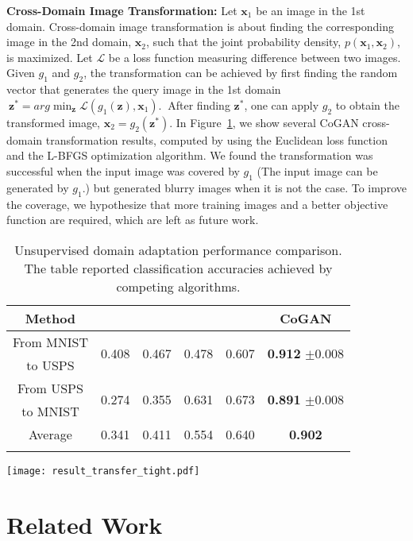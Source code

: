 \documentclass{article}
\begin{document}
{\bf Cross-Domain Image Transformation:} Let $\mathbf{x}_1$ be an image in the 1st domain. Cross-domain image transformation is about finding the corresponding image in the 2nd domain, $\mathbf{x}_2$, such that the joint probability density, $p(\mathbf{x}_1,\mathbf{x}_2)$, is maximized. Let $\mathcal{L}$ be a loss function measuring difference between two images. Given $g_1$ and $g_2$, the transformation can be achieved by first finding the random vector that generates the query image in the 1st domain 
$\medspace
\mathbf{z}^* = arg\min_{\mathbf{z}} \mathcal{L}(g_1(\mathbf{z}),\mathbf{x}_1).\label{eqn::domain_trans}
\medspace$
After finding $\mathbf{z}^*$, one can apply $g_2$ to obtain the transformed image, $\mathbf{x}_2=g_2(\mathbf{z}^*)$. In Figure~\ref{fig::result_transfer}, we show several CoGAN cross-domain transformation results, computed by using the Euclidean loss function and the L-BFGS optimization algorithm. We found the transformation was successful when the input image was covered by $g_1$ (The input image can be generated by $g_1$.) but generated blurry images when it is not the case. To improve the coverage, we hypothesize that more training images and a better objective function are required, which are left as future work.

\begin{table}[t!]
\begin{minipage}[c]{0.65\linewidth}
\centering
	\small
	\begin{tabular}{cccccc}
	Method & \cite{long2013transfer} & \cite{fernando2015joint} & \cite{tzeng2014deep} & \cite{rozantsev2016beyond} & CoGAN\\
	\hline
	From MNIST & \multirow{ 2}{*}{0.408} & \multirow{ 2}{*}{0.467} & \multirow{ 2}{*}{0.478} & \multirow{ 2}{*}{0.607} & \multirow{ 2}{*}{{\bf 0.912} $\pm$0.008}\\
	to USPS & \\	
	From USPS & \multirow{ 2}{*}{0.274} & \multirow{ 2}{*}{0.355} & \multirow{ 2}{*}{0.631} & \multirow{ 2}{*}{0.673} & \multirow{ 2}{*}{{\bf 0.891} $\pm$0.008}\\
	to MNIST & \\		
	Average                & 0.341 & 0.411 & 0.554 & 0.640 & {\bf 0.902}\\
	\hline\\
	\end{tabular}	
\caption{\small Unsupervised domain adaptation performance comparison. The table reported classification accuracies achieved by competing algorithms.}	
\label{tbl::uda}
\end{minipage}\hfill
\begin{minipage}[c]{0.30\linewidth}
\centering
\texttt{[image: result\_transfer\_tight.pdf]}    
\label{fig::result_transfer}
\end{minipage}
\end{table} \section{Related Work}\label{sec::rel}
\end{document}
